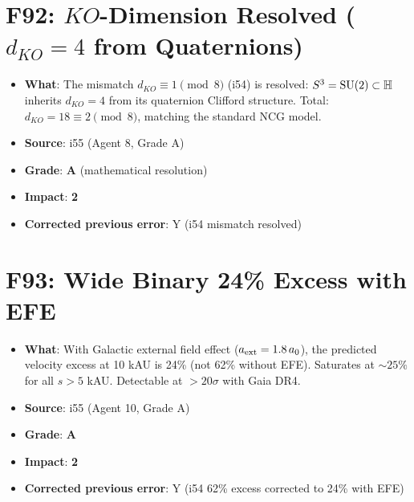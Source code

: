 \documentclass[11pt,a4paper]{article}
\newcommand{\grade}[1]{\textbf{#1}}
\newcommand{\impact}[1]{\textbf{#1}}
\begin{document}
\section{F92: $KO$-Dimension Resolved ($d_{KO} = 4$ from Quaternions)}
\begin{itemize}[nosep]
\item \textbf{What}: The mismatch $d_{KO} \equiv 1 \pmod{8}$ (i54) is resolved: $S^3 = {\rm SU}(2) \subset \mathbb{H}$ inherits $d_{KO} = 4$ from its quaternion Clifford structure. Total: $d_{KO} = 18 \equiv 2 \pmod{8}$, matching the standard NCG model.
\item \textbf{Source}: i55 (Agent 8, Grade A)
\item \textbf{Grade}: \grade{A} (mathematical resolution)
\item \textbf{Impact}: \impact{2}
\item \textbf{Corrected previous error}: Y (i54 mismatch resolved)
\end{itemize}

\section{F93: Wide Binary 24\% Excess with EFE}
\begin{itemize}[nosep]
\item \textbf{What}: With Galactic external field effect ($a_{\rm ext} = 1.8\,a_0$), the predicted velocity excess at 10 kAU is 24\% (not 62\% without EFE). Saturates at $\sim 25\%$ for all $s > 5$ kAU. Detectable at $> 20\sigma$ with Gaia DR4.
\item \textbf{Source}: i55 (Agent 10, Grade A)
\item \textbf{Grade}: \grade{A}
\item \textbf{Impact}: \impact{2}
\item \textbf{Corrected previous error}: Y (i54 62\% excess corrected to 24\% with EFE)
\end{itemize}

\end{document}
